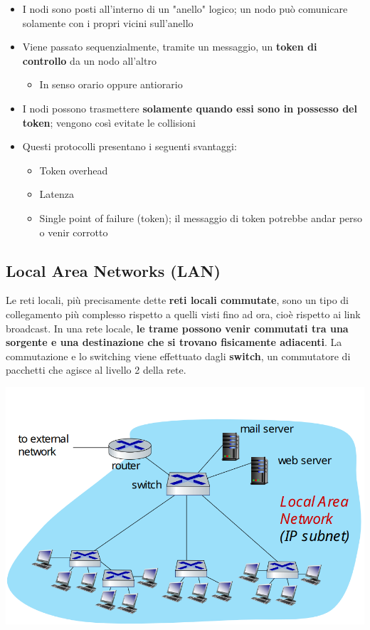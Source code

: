 \documentclass[12pt]{article}
\begin{document}
\begin{itemize}
    \item I nodi sono posti all'interno di un "anello" logico; un nodo può comunicare solamente con i propri vicini sull'anello
    \item Viene passato sequenzialmente, tramite un messaggio, un \textbf{token di controllo} da un nodo all'altro
    \begin{itemize}
        \item In senso orario oppure antiorario
    \end{itemize}
    \item I nodi possono trasmettere \textbf{solamente quando essi sono in possesso del token}; vengono così evitate le collisioni
    \item Questi protocolli presentano i seguenti svantaggi:
    \begin{itemize}
        \item Token overhead
        \item Latenza
        \item Single point of failure (token); il messaggio di token potrebbe andar perso o venir corrotto
    \end{itemize}
\end{itemize}
\subsection{Local Area Networks (LAN)}
Le reti locali, più precisamente dette \textbf{reti locali commutate}, sono un tipo di collegamento
più complesso rispetto a quelli visti fino ad ora, cioè rispetto ai link broadcast. In una rete locale, \textbf{le trame possono venir commutati tra una sorgente e una destinazione che si trovano fisicamente adiacenti}.
La commutazione e lo switching viene effettuato dagli \textbf{switch}, un commutatore di pacchetti che agisce al livello 2 della rete.
\begin{center}
    \includegraphics[width =1\linewidth]{Images/124.png}
\end{center}
\end{document}
